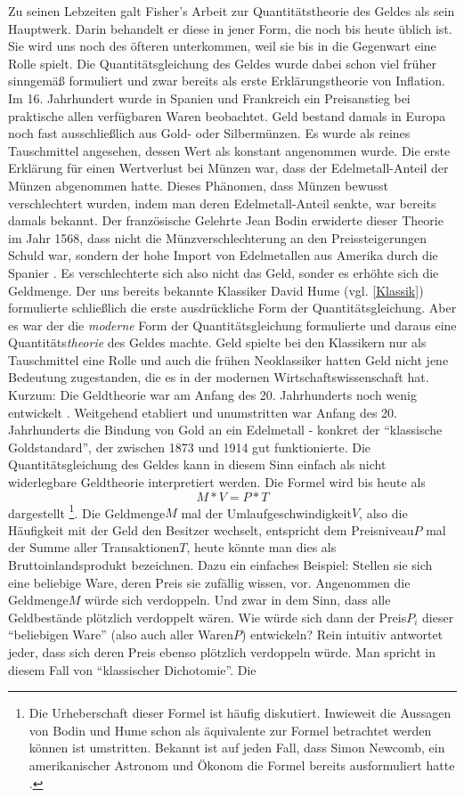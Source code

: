 Zu seinen Lebzeiten galt Fisher's Arbeit zur Quantitätstheorie des Geldes \textcite{Fisher1911} als sein Hauptwerk. Darin behandelt er diese in jener Form, die noch bis heute üblich ist. Sie wird uns noch des öfteren unterkommen, weil sie bis in die Gegenwart eine Rolle spielt. Die Quantitätsgleichung des Geldes wurde dabei schon viel früher sinngemäß formuliert und zwar bereits als erste Erklärungstheorie von Inflation. Im 16. Jahrhundert wurde in Spanien und Frankreich ein Preisanstieg bei praktische allen verfügbaren Waren beobachtet. Geld bestand damals in Europa noch fast ausschließlich aus Gold- oder Silbermünzen. Es wurde als reines Tauschmittel angesehen, dessen Wert als konstant angenommen wurde. Die erste Erklärung für einen Wertverlust bei Münzen war, dass der Edelmetall-Anteil der Münzen abgenommen hatte. Dieses Phänomen, dass Münzen bewusst verschlechtert wurden, indem man deren Edelmetall-Anteil senkte, war bereits damals bekannt. Der französische Gelehrte Jean Bodin erwiderte dieser Theorie im Jahr 1568, dass nicht die Münzverschlechterung an den Preissteigerungen Schuld war, sondern der hohe Import von Edelmetallen aus Amerika durch die Spanier \parencite{OBrien2000}. Es verschlechterte sich also nicht das Geld, sonder es erhöhte sich die Geldmenge. Der uns bereits bekannte Klassiker David Hume (vgl. \ref{Klassik}) formulierte schließlich die erste ausdrückliche Form der Quantitätsgleichung. Aber es war \textcite{Fisher1911} der die \textit{moderne} Form der Quantitätsgleichung formulierte und daraus eine Quantitäts\textit{theorie} des Geldes machte. Geld spielte bei den Klassikern nur als Tauschmittel eine Rolle und auch die frühen Neoklassiker hatten Geld nicht jene Bedeutung zugestanden, die es in der modernen Wirtschaftswissenschaft hat. Kurzum: Die Geldtheorie war am Anfang des 20. Jahrhunderts noch wenig entwickelt \parencite[S. 32]{ Tobin2005}. Weitgehend etabliert und unumstritten war Anfang des 20. Jahrhunderts die Bindung von Gold an ein Edelmetall - konkret der "`klassische Goldstandard"', der zwischen 1873 und 1914 gut funktionierte. Die Quantitätsgleichung des Geldes kann in diesem Sinn einfach als nicht widerlegbare Geldtheorie interpretiert werden. Die Formel wird bis heute als $$M*V = P*T$$ dargestellt \footnote{Die Urheberschaft dieser Formel ist häufig diskutiert. Inwieweit die Aussagen von Bodin und Hume schon als äquivalente zur Formel betrachtet werden können ist umstritten. Bekannt ist auf jeden Fall, dass Simon Newcomb, ein amerikanischer Astronom und Ökonom die Formel bereits ausformuliert hatte \parencite[S. 33]{Tobin2005}.}. Die Geldmenge$M$ mal der Umlaufgeschwindigkeit$V$, also die Häufigkeit mit der Geld den Besitzer wechselt, entspricht dem Preisniveau$P$ mal der Summe aller Transaktionen$T$, heute könnte man dies als Bruttoinlandsprodukt bezeichnen. Dazu ein einfaches Beispiel: Stellen sie sich eine beliebige Ware, deren Preis sie zufällig wissen, vor. Angenommen die Geldmenge$M$ würde sich verdoppeln. Und zwar in dem Sinn, dass alle Geldbestände plötzlich verdoppelt wären. Wie würde sich dann der Preis$P_i$ dieser "`beliebigen Ware"' (also auch aller Waren$P$) entwickeln? Rein intuitiv antwortet jeder, dass sich deren Preis ebenso plötzlich verdoppeln würde. Man spricht in diesem Fall von "`klassischer Dichotomie"'. Die 